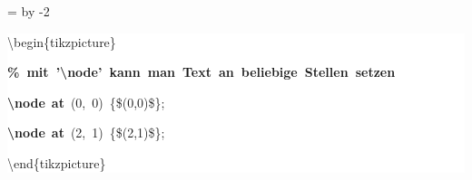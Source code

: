 \begingroup
\ttfamily
{}
=\textwidth
\advance{} by -2\fboxsep
\noindent
\colorbox{background}
{%
\parbox{\dimen255}
{%
\rule[-0.5ex]{0pt}{2.5ex}\hspace*{0.0em}\textbackslash{}begin\{tikzpicture\}\\
\rule[-0.5ex]{0pt}{2.5ex}\hspace*{1.0em}\textcolor{G}{\textbf{\%~mit~'\textbackslash{}node'~kann~man~Text~an~beliebige~Stellen~setzen}}\\
\rule[-0.5ex]{0pt}{2.5ex}\hspace*{1.0em}\textcolor{R}{\textbf{\textbackslash{}node}}~\textcolor{R}{\textbf{at}}~(0,~0)~\{\$(0,0)\$\};\\
\rule[-0.5ex]{0pt}{2.5ex}\hspace*{1.0em}\textcolor{R}{\textbf{\textbackslash{}node}}~\textcolor{R}{\textbf{at}}~(2,~1)~\{\$(2,1)\$\};\\
\rule[-0.5ex]{0pt}{2.5ex}\hspace*{0.0em}\textbackslash{}end\{tikzpicture\}}%
}%
\endgroup
